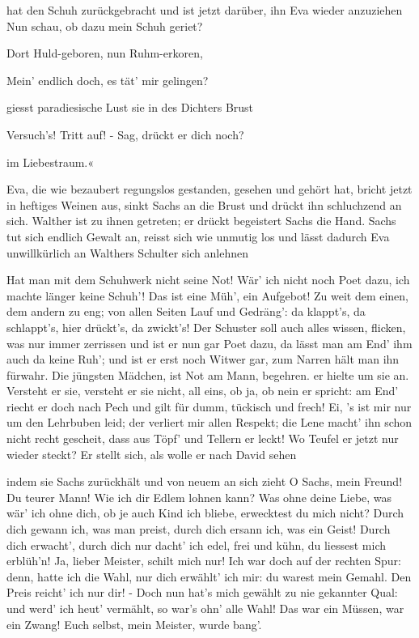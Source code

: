\begin{drama}
\Sachsspeaks
hat den Schuh zurückgebracht und ist jetzt darüber, ihn Eva wieder anzuziehen
Nun schau, ob dazu mein Schuh geriet?

\Waltherspeaks
Dort Huld-geboren, nun Ruhm-erkoren,

\Sachsspeaks
Mein' endlich doch,
es tät' mir gelingen?

\Waltherspeaks
giesst paradiesische Lust sie in des Dichters Brust

\Sachsspeaks
Versuch's! Tritt auf! - Sag, drückt er dich noch?

\Waltherspeaks
im Liebestraum.«

Eva, die wie bezaubert regungslos gestanden, gesehen und gehört hat, bricht jetzt in heftiges Weinen aus, sinkt Sachs an die Brust und drückt ihn schluchzend an sich. Walther ist zu ihnen getreten; er drückt begeistert Sachs die Hand. Sachs tut sich endlich Gewalt an, reisst sich wie unmutig los und lässt dadurch Eva unwillkürlich an Walthers Schulter sich anlehnen

\Sachsspeaks
Hat man mit dem Schuhwerk nicht seine Not!
Wär' ich nicht noch Poet dazu,
ich machte länger keine Schuh'!
Das ist eine Müh', ein Aufgebot!
Zu weit dem einen, dem andern zu eng;
von allen Seiten Lauf und Gedräng':
da klappt's, da schlappt's,
hier drückt's, da zwickt's!
Der Schuster soll auch alles wissen,
flicken, was nur immer zerrissen
und ist er nun gar Poet dazu,
da lässt man am End' ihm auch da keine Ruh';
und ist er erst noch Witwer gar,
zum Narren hält man ihn fürwahr.
Die jüngsten Mädchen, ist Not am Mann,
begehren. er hielte um sie an.
Versteht er sie, versteht er sie nicht,
all eins, ob ja, ob nein er spricht:
am End' riecht er doch nach Pech
und gilt für dumm, tückisch und frech!
Ei, 's ist mir nur um den Lehrbuben leid;
der verliert mir allen Respekt;
die Lene macht' ihn schon nicht recht gescheit,
dass aus Töpf' und Tellern er leckt!
Wo Teufel er jetzt nur wieder steckt?
Er stellt sich, als wolle er nach David sehen

\Evaspeaks
indem sie Sachs zurückhält und von neuem an sich zieht
O Sachs, mein Freund! Du teurer Mann!
Wie ich dir Edlem lohnen kann?
Was ohne deine Liebe, was wär' ich ohne dich,
ob je auch Kind ich bliebe,
erwecktest du mich nicht?
Durch dich gewann ich,
was man preist,
durch dich ersann ich,
was ein Geist!
Durch dich erwacht',
durch dich nur dacht'
ich edel, frei und kühn,
du liessest mich erblüh'n!
Ja, lieber Meister, schilt mich nur!
Ich war doch auf der rechten Spur:
denn, hatte ich die Wahl,
nur dich erwählt' ich mir:
du warest mein Gemahl.
Den Preis reicht' ich nur dir! -
Doch nun hat's mich gewählt
zu nie gekannter Qual:
und werd' ich heut' vermählt,
so war's ohn' alle Wahl!
Das war ein Müssen, war ein Zwang!
Euch selbst, mein Meister, wurde bang'.


\end{drama}

